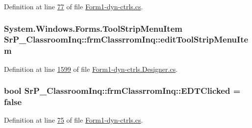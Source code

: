 \-Definition at line \hyperlink{_form1-dyn-ctrls_8cs_source_l00077}{77} of file \hyperlink{_form1-dyn-ctrls_8cs_source}{\-Form1-\/dyn-\/ctrls.\-cs}.

\hypertarget{class_sr_p___classroom_inq_1_1frm_classrrom_inq_a3e1d074025f88cab6f1911c123de6abb}{
\subsubsection[{edit\-Tool\-Strip\-Menu\-Item}]{\setlength{\rightskip}{0pt plus 5cm}\-System.\-Windows.\-Forms.\-Tool\-Strip\-Menu\-Item {\bf \-Sr\-P\-\_\-\-Classroom\-Inq\-::frm\-Classrrom\-Inq\-::edit\-Tool\-Strip\-Menu\-Item}}}
\label{class_sr_p___classroom_inq_1_1frm_classrrom_inq_a3e1d074025f88cab6f1911c123de6abb}


\-Definition at line \hyperlink{_form1-dyn-ctrls_8_designer_8cs_source_l01599}{1599} of file \hyperlink{_form1-dyn-ctrls_8_designer_8cs_source}{\-Form1-\/dyn-\/ctrls.\-Designer.\-cs}.

\hypertarget{class_sr_p___classroom_inq_1_1frm_classrrom_inq_a2f126b875f216c20427f6818976a9465}{
\subsubsection[{\-E\-D\-T\-Clicked}]{\setlength{\rightskip}{0pt plus 5cm}bool {\bf \-Sr\-P\-\_\-\-Classroom\-Inq\-::frm\-Classrrom\-Inq\-::\-E\-D\-T\-Clicked} = false}}
\label{class_sr_p___classroom_inq_1_1frm_classrrom_inq_a2f126b875f216c20427f6818976a9465}


\-Definition at line \hyperlink{_form1-dyn-ctrls_8cs_source_l00075}{75} of file \hyperlink{_form1-dyn-ctrls_8cs_source}{\-Form1-\/dyn-\/ctrls.\-cs}.

